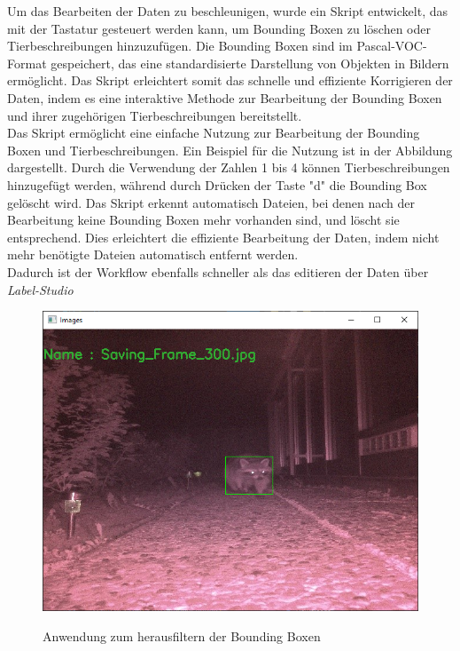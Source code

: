 Um das Bearbeiten der Daten zu beschleunigen, wurde ein Skript entwickelt, das mit der Tastatur gesteuert werden kann, um Bounding Boxen zu löschen oder Tierbeschreibungen hinzuzufügen. Die Bounding Boxen sind im Pascal-VOC-Format gespeichert, das eine standardisierte Darstellung von Objekten in Bildern ermöglicht. Das Skript erleichtert somit das schnelle und effiziente Korrigieren der Daten, indem es eine interaktive Methode zur Bearbeitung der Bounding Boxen und ihrer zugehörigen Tierbeschreibungen bereitstellt.
\\
Das Skript ermöglicht eine einfache Nutzung zur Bearbeitung der Bounding Boxen und Tierbeschreibungen. Ein Beispiel für die Nutzung ist in der Abbildung dargestellt. Durch die Verwendung der Zahlen 1 bis 4 können Tierbeschreibungen hinzugefügt werden, während durch Drücken der Taste "d" die Bounding Box gelöscht wird. Das Skript erkennt automatisch Dateien, bei denen nach der Bearbeitung keine Bounding Boxen mehr vorhanden sind, und löscht sie entsprechend. Dies erleichtert die effiziente Bearbeitung der Daten, indem nicht mehr benötigte Dateien automatisch entfernt werden.
\\
Dadurch ist der Workflow ebenfalls schneller als das editieren der Daten über \textit{Label-Studio}

\begin{figure}[H]
    \centering
    \includegraphics[width=\textwidth]{images/xml_relabel.png}
    \label{fig:xml_relab}
    \caption{Anwendung zum herausfiltern der Bounding Boxen}
\end{figure}

